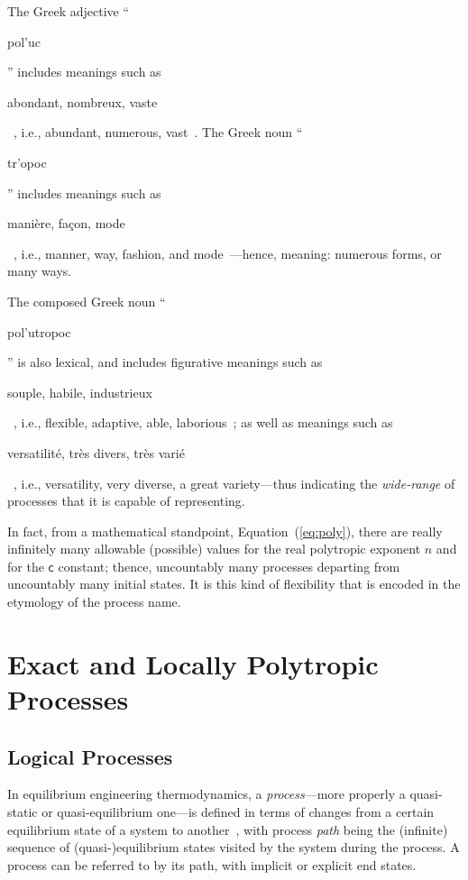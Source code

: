 \documentclass[fleqn,11pt]{SelfArx}
\newcommand{\GRtxt}[1]{\begin{otherlanguage}{greek}{{#1}}\end{otherlanguage}}
\newcommand{\FRtxt}[1]{\begin{otherlanguage}{french}{{#1}}\end{otherlanguage}}
\begin{document}
    The Greek adjective  ``\GRtxt{pol'uc}''  includes  meanings  such  as  \FRtxt{\og  abondant,
    nombreux,   vaste   \fg}~\cite{1968-Chantraine-Klincksieck},   i.e.,   abundant,   numerous,
    vast~\cite{2009-BarrierMA+ViviesC-Auzou,  2011-SilvaASM-WMFMartinsFontes}.  The  Greek  noun
    ``\GRtxt{tr'opoc}''  includes   meanings   such   as   \FRtxt{\og   manière,   façon,   mode
    \fg}~\cite{2000-BaillyA-Hachette},      i.e.,      manner,      way,      fashion,       and
    mode~\cite{2009-BarrierMA+ViviesC-Auzou,  2011-SilvaASM-WMFMartinsFontes}---hence,  meaning:
    numerous forms, or many ways.

    The composed Greek noun ``\GRtxt{pol'utropoc}'' is also  lexical,  and  includes  figurative
    meanings such as \FRtxt{\og souple, habile,  industrieux  \fg}~\cite{2000-BaillyA-Hachette},
    i.e., flexible, adaptive, able, laborious~\cite{2011-SilvaASM-WMFMartinsFontes}; as well  as
    meanings    such    as    \FRtxt{\og    versatilité,     très     divers,     très     varié
    \fg}~\cite{2000-BaillyA-Hachette}, i.e., versatility, very diverse, a  great  variety---thus
    indicating the \emph{wide-range} of processes that it is capable of representing.

    In  fact,  from  a  mathematical  standpoint,  Equation~(\ref{eq:poly}),  there  are  really
    infinitely many allowable (possible) values for the real polytropic exponent $n$ and for the
    $\mathsf{c}$ constant; thence, uncountably many processes departing  from  uncountably  many
    initial states. It is this kind of flexibility that is  encoded  in  the  etymology  of  the
    process name.

\section{Exact and Locally Polytropic Processes}

    \subsection{Logical Processes}

    In equilibrium engineering thermodynamics, a \emph{process}---more properly  a  quasi-static
    or quasi-equilibrium one---is defined in terms of changes from a certain  equilibrium  state
    of a system to another~\cite{2013-CengelYA+BolesMA-AMGH}, with process \emph{path} being the
    (infinite) sequence of (quasi-)equilibrium states visited by the system during the  process.
    A process can be referred to by its path, with implicit or explicit end states.
\end{document}
